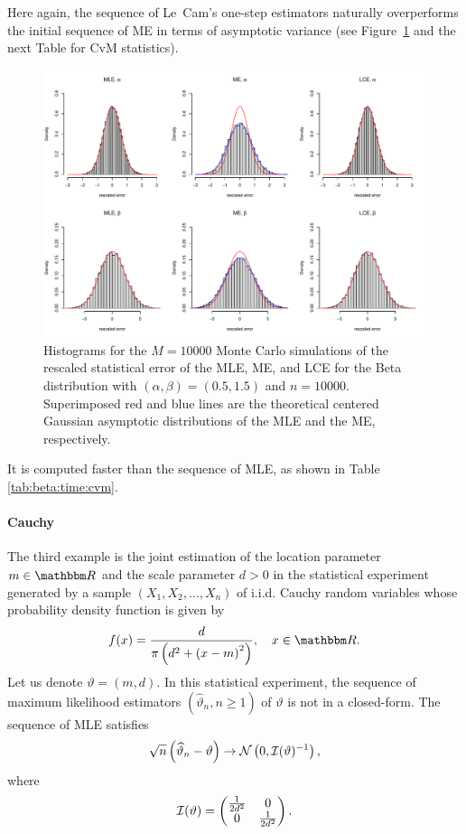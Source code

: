 Here again, the sequence of Le~Cam's one-step estimators naturally overperforms the initial sequence of ME in terms of asymptotic variance (see Figure~\ref{fig:beta} and the next Table for CvM statistics). 

\begin{figure}[ht]
\centering
\includegraphics[width=\textwidth]{fig-Beta.pdf}
\caption{Histograms for the $M=10000$ Monte Carlo simulations of the rescaled statistical error of the MLE, ME, and LCE for the Beta distribution with $(\alpha,\beta)=(0.5,1.5)$ and $n=10000$. Superimposed red and blue lines are the theoretical centered Gaussian asymptotic distributions of the MLE and the ME, respectively.}\label{fig:beta}
\end{figure}

It is computed faster than the sequence of MLE, as shown in Table \ref{tab:beta:time:cvm}.





\paragraph{Cauchy}The third example is the joint estimation of the location parameter $m\in\mb{R}$ and the scale parameter $d>0$ in the statistical experiment generated by a sample $(X_1,X_2,\ldots,X_n)$ of i.i.d. Cauchy random variables whose probability density function is given by
\begin{equation}\label{cauchy}
 f(x) = \frac{d}{\pi \left(d^2+\left(x-m\right)^2\right)}, \quad x \in \mb{R}.
\end{equation}
Let us denote $\vartheta=(m,d)$. In this statistical experiment, the sequence of maximum likelihood estimators $(\widehat{\vartheta}_n, n \geq 1)$ of $\vartheta$ is not in a closed-form.  The sequence of MLE satisfies 
$$ \sqrt{n}\left( \widehat{\vartheta}_n-\vartheta \right) \rightarrow {\cal N}\left(0,{\cal I}(\vartheta)^{-1}\right),$$
where 
$$ {\cal I}(\vartheta)=\begin{pmatrix}\frac{1}{2d^2} & 0 \\ 0&  \frac{1}{2d^2}\end{pmatrix}.$$

